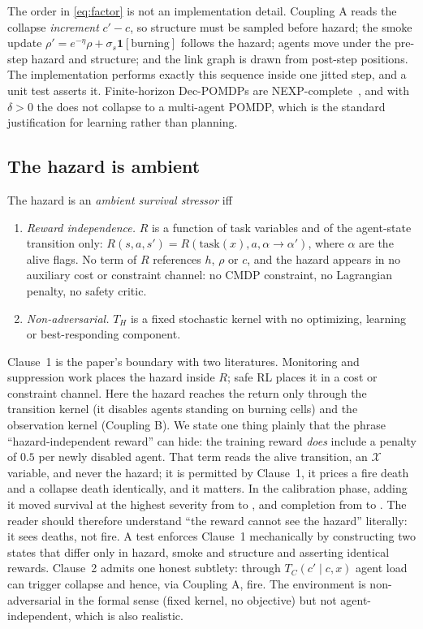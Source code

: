 The order in \eqref{eq:factor} is not an implementation detail. Coupling A
reads the collapse \emph{increment} $c' - c$, so structure must be sampled
before hazard; the smoke update $\rho' = e^{-\eta}\rho + \sigma_s
\mathbf{1}[\text{burning}]$ follows the hazard; agents move under the
pre-step hazard and structure; and the link graph is drawn from post-step
positions. The implementation performs exactly this sequence inside one
jitted step, and a unit test asserts it. Finite-horizon Dec-POMDPs are
NEXP-complete~\citep{bernstein2002}, and with $\delta > 0$ the \CHE{} does not
collapse to a multi-agent POMDP, which is the standard justification for
learning rather than planning.

\subsection{The hazard is ambient}

\begin{definition}
\label{def:ambient}
The hazard is an \emph{ambient survival stressor} iff
\begin{enumerate}[leftmargin=*,itemsep=1pt]
  \item \emph{Reward independence.} $R$ is a function of task variables and
  of the agent-state transition only: $R(s,a,s') = R(\mathrm{task}(x), a,
  \alpha \to \alpha')$, where $\alpha$ are the alive flags. No term of $R$
  references $h$, $\rho$ or $c$, and the hazard appears in no auxiliary cost
  or constraint channel: no CMDP constraint, no Lagrangian penalty, no
  safety critic.
  \item \emph{Non-adversarial.} $T_H$ is a fixed stochastic kernel with no
  optimizing, learning or best-responding component.
\end{enumerate}
\end{definition}

Clause~1 is the paper's boundary with two literatures. Monitoring and
suppression work places the hazard inside $R$; safe RL places it in a cost or
constraint channel. Here the hazard reaches the return only through the
transition kernel (it disables agents standing on burning cells) and the
observation kernel (Coupling B). We state one thing plainly that the phrase
``hazard-independent reward'' can hide: the training reward \emph{does}
include a penalty of $0.5$ per newly disabled agent. That term reads the
alive transition, an $\mathcal{X}$ variable, and never the hazard; it is
permitted by Clause~1, it prices a fire death and a collapse death
identically, and it matters. In the calibration phase, adding it moved
survival at the highest severity from  to
, and completion from  to
. The reader should therefore
understand ``the reward cannot see the hazard'' literally: it sees deaths, not
fire. A test enforces Clause~1 mechanically by constructing two states that
differ only in hazard, smoke and structure and asserting identical rewards.
Clause~2 admits one honest subtlety: through $T_C(c' \mid c, x)$ agent load
can trigger collapse and hence, via Coupling A, fire. The environment is
non-adversarial in the formal sense (fixed kernel, no objective) but not
agent-independent, which is also realistic.

